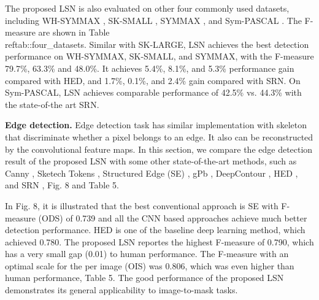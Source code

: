 \documentclass[runningheads]{llncs}
\begin{document}
\setlength{\tabcolsep}{1.4pt}




The proposed LSN is also evaluated on other four commonly used datasets, including WH-SYMMAX \cite{ref17}, SK-SMALL \cite{ref7}, SYMMAX \cite{ref15}, and Sym-PASCAL \cite{ref1}. The F-measure are shown in Table\\ref{tab::four_datasets}. Similar with SK-LARGE, LSN achieves the best detection performance on WH-SYMMAX, SK-SMALL, and SYMMAX, with the F-measure 79.7\%, 63.3\% and 48.0\%. It achieves 5.4\%, 8.1\%, and 5.3\% performance gain compared with HED, and 1.7\%, 0.1\%, and 2.4\% gain compared with SRN. On Sym-PASCAL, LSN achieves comparable performance of 42.5\% vs. 44.3\% with the state-of-the art SRN.


\textbf{Edge detection.} 
Edge detection task has similar implementation with skeleton that discriminate whether a pixel belongs to an edge. It also can be reconstructed by the convolutional feature maps. In this section, we compare the edge detection result of the proposed LSN with some other state-of-the-art methods, such as Canny \cite{ref40}, Sketech Tokens \cite{ref39}, Structured Edge (SE) \cite{ref38}, gPb \cite{ref35}, DeepContour \cite{ref18}, HED \cite{ref6}, and SRN \cite{ref1}, Fig. 8 and Table 5.

In Fig. 8, it is illustrated that the best conventional approach is SE with F-measure (ODS) of 0.739 and all the CNN based approaches achieve much better detection performance. HED is one of the baseline deep learning method, which achieved 0.780. The proposed LSN reportes the highest F-measure of 0.790, which has a very small gap (0.01) to human performance. The F-measure with an optimal scale for the per image (OIS) was 0.806, which was even higher than human performance, Table 5. The good performance of the proposed LSN demonstrates its general applicability to image-to-mask tasks.
\end{document}
